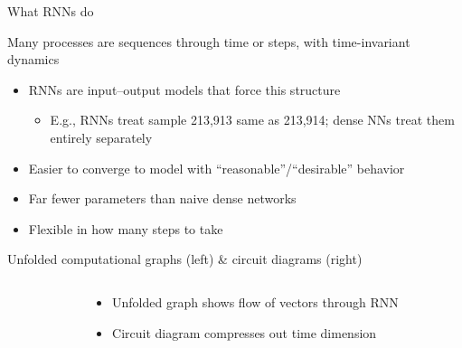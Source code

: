 \begin{frame}{What RNNs do}
    \begin{block}{}
        Many processes are sequences through \alert{time} or \alert{steps}, with \alert{time-invariant dynamics}
    \end{block}
    \pause

    \begin{itemize}
        \item RNN{}s are input--output models that force this structure
        \begin{itemize}
            \item E.g., RNN{}s treat sample 213,913 same as 213,914; dense NN{}s treat them entirely separately
        \end{itemize}
        \item Easier to converge to model with ``reasonable''/``desirable'' behavior
        \item Far fewer parameters than naive dense networks
        \item Flexible in how many steps to take
    \end{itemize}
\end{frame}

\begin{frame}{Unfolded computational graphs (left) \& circuit diagrams (right)}
    \begin{columns}
        \begin{column}{0.71\textwidth}
            \uncover<+->{}
            \uncover<+->{}
        \end{column}
        \begin{column}{0.29\textwidth}
            \begin{itemize}
                \item<1-> Unfolded graph shows flow of vectors through RNN
                \item<2-> Circuit diagram compresses out time dimension
            \end{itemize}
        \end{column}
    \end{columns}
\end{frame}

